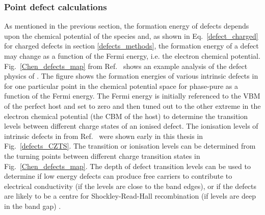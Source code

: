 \documentclass[11pt, twoside]{report}
\begin{document}
\subsubsection{Point defect calculations}

As mentioned in the previous section, the formation energy of defects depends upon the chemical potential of the species and, as shown in Eq.~\ref{defect_charged} for charged defects in section \ref{defects_methods}, the formation energy of a defect may change as a function of the Fermi energy, i.e. the electron chemical potential.
Fig.~\ref{Chen_defects_map} from Ref.~\cite{defects_Chen_large} shows an example analysis of the defect physics of {\CZTS}. The figure shows the formation energies of various intrinsic defects in {\CZTS} for one particular point in the chemical potential space for phase-pure {\CZTS} as a function of the Fermi energy.
The Fermi energy is initially referenced to the VBM of the perfect host and set to zero and then tuned out to the other extreme in the electron chemical potential (the CBM of the host) to determine the transition levels between different charge states of an ionised defect.
The ionisation levels of intrinsic defects in {\CZTS} from Ref.~ were shown early in this thesis in Fig.~\ref{defects_CZTS}. The transition or ionisation levels can be determined from the turning points between different charge transition states in Fig.~\ref{Chen_defects_map}. The depth of defect transition levels can be used to determine if low energy defects can produce free carriers to contribute to electrical conductivity (if the levels are close to the band edges), or if the defects are likely to be a centre for Shockley-Read-Hall recombination (if levels are deep in the band gap) \cite{Aron_defect_tolerance}.
\end{document}

